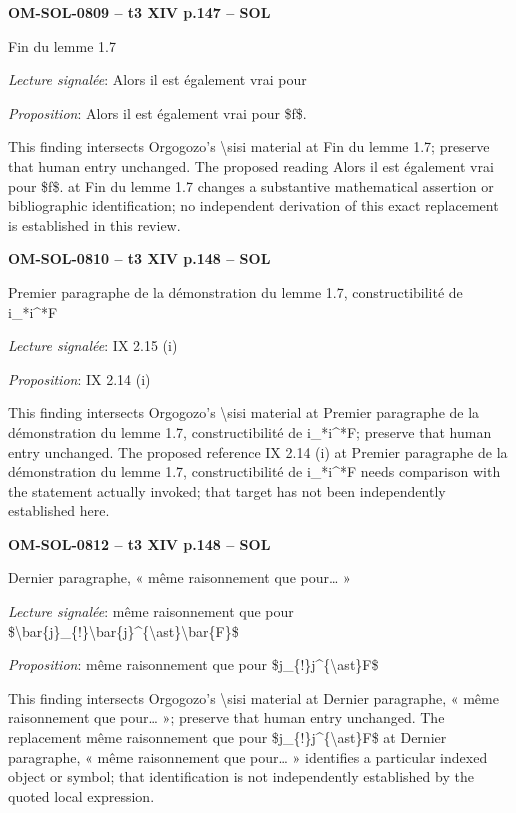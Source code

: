 \par\noindent\textbf{OM-SOL-0809 -- t3 XIV p.147 -- SOL}\par
Fin du lemme 1.7\par
\emph{Lecture signalée}: Alors il est également vrai pour\par
\emph{Proposition}: Alors il est également vrai pour \$f\$.\par
This finding intersects Orgogozo's \textbackslash{}sisi material at Fin du lemme 1.7; preserve that human entry unchanged. The proposed reading Alors il est également vrai pour \$f\$. at Fin du lemme 1.7 changes a substantive mathematical assertion or bibliographic identification; no independent derivation of this exact replacement is established in this review.\par
\par\noindent\textbf{OM-SOL-0810 -- t3 XIV p.148 -- SOL}\par
Premier paragraphe de la démonstration du lemme 1.7, constructibilité de i\_*i\textasciicircum{}*F\par
\emph{Lecture signalée}: IX 2.15 (i)\par
\emph{Proposition}: IX 2.14 (i)\par
This finding intersects Orgogozo's \textbackslash{}sisi material at Premier paragraphe de la démonstration du lemme 1.7, constructibilité de i\_*i\textasciicircum{}*F; preserve that human entry unchanged. The proposed reference IX 2.14 (i) at Premier paragraphe de la démonstration du lemme 1.7, constructibilité de i\_*i\textasciicircum{}*F needs comparison with the statement actually invoked; that target has not been independently established here.\par
\par\noindent\textbf{OM-SOL-0812 -- t3 XIV p.148 -- SOL}\par
Dernier paragraphe, « même raisonnement que pour… »\par
\emph{Lecture signalée}: même raisonnement que pour \$\textbackslash{}bar\{j\}\_\{!\}\textbackslash{}bar\{j\}\textasciicircum{}\{\textbackslash{}ast\}\textbackslash{}bar\{F\}\$\par
\emph{Proposition}: même raisonnement que pour \$j\_\{!\}j\textasciicircum{}\{\textbackslash{}ast\}F\$\par
This finding intersects Orgogozo's \textbackslash{}sisi material at Dernier paragraphe, « même raisonnement que pour… »; preserve that human entry unchanged. The replacement même raisonnement que pour \$j\_\{!\}j\textasciicircum{}\{\textbackslash{}ast\}F\$ at Dernier paragraphe, « même raisonnement que pour… » identifies a particular indexed object or symbol; that identification is not independently established by the quoted local expression.\par
